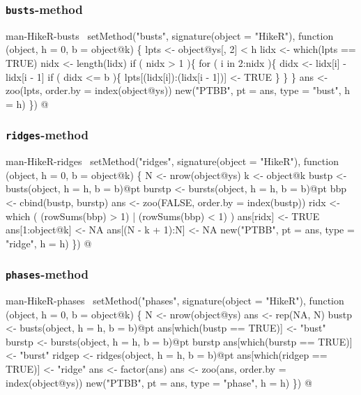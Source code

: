 \documentclass[a4paper]{article}
\begin{document}
\subsubsection{\texttt{busts}-method}

\nwenddocs{}\endmoddef
\LA{}man-HikeR-busts~{\nwtagstyle{}}\RA{}
setMethod("busts",
    signature(object = "HikeR"),
    function (object, h = 0, b = object@k) \{
        lpts <- object@ys[, 2] < h
        lidx <- which(lpts == TRUE)
        nidx <- length(lidx)
        if ( nidx > 1 )\{
            for ( i in 2:nidx )\{
                didx <- lidx[i] - lidx[i - 1]
                if ( didx <= b )\{
                    lpts[(lidx[i]):(lidx[i - 1])] <- TRUE
                \}
            \}
        \}
        ans <- zoo(lpts, order.by = index(object@ys))
        new("PTBB", pt = ans, type = "bust", h = h)
\})
\nwendcode{}@

\subsubsection{\texttt{ridges}-method}

\nwenddocs{}\endmoddef
\LA{}man-HikeR-ridges~{\nwtagstyle{}}\RA{}
setMethod("ridges",
    signature(object = "HikeR"),
    function (object, h = 0, b = object@k) \{
        N <- nrow(object@ys)
        k <- object@k
        bustp <- busts(object, h = h, b = b)@pt
        burstp <- bursts(object, h = h, b = b)@pt
        bbp <- cbind(bustp, burstp)
        ans <- zoo(FALSE, order.by = index(bustp))
        ridx <- which ( (rowSums(bbp) > 1) | (rowSums(bbp) < 1) )
        ans[ridx] <- TRUE
        ans[1:object@k] <- NA
        ans[(N - k + 1):N] <- NA
        new("PTBB", pt = ans, type = "ridge", h = h)
\})
\nwendcode{}@

\subsubsection{\texttt{phases}-method}

\nwenddocs{}\endmoddef
\LA{}man-HikeR-phases~{\nwtagstyle{}}\RA{}
setMethod("phases",
    signature(object = "HikeR"),
    function (object, h = 0, b = object@k) \{
        N <- nrow(object@ys)
        ans <- rep(NA, N)
        bustp <- busts(object, h = h, b = b)@pt
        ans[which(bustp == TRUE)] <- "bust"
        burstp <- bursts(object, h = h, b = b)@pt
        burstp
        ans[which(burstp == TRUE)] <- "burst"
        ridgep <- ridges(object, h = h, b = b)@pt
        ans[which(ridgep == TRUE)] <- "ridge"
        ans <- factor(ans)
        ans <- zoo(ans, order.by = index(object@ys))
        new("PTBB", pt = ans, type = "phase", h = h)
\})
\nwendcode{}@
\end{document}
